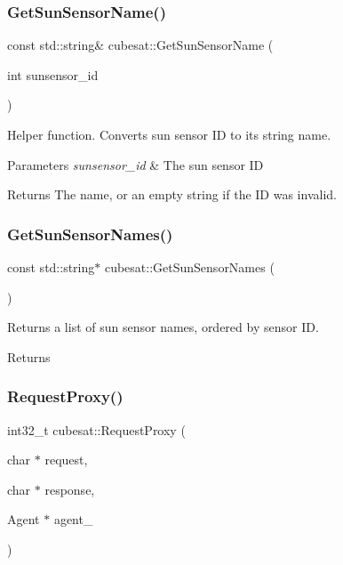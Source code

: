 \subsubsection{\texorpdfstring{Get\+Sun\+Sensor\+Name()}{GetSunSensorName()}}
{\footnotesize\ttfamily const std\+::string\& cubesat\+::\+Get\+Sun\+Sensor\+Name (\begin{DoxyParamCaption}\item[{int}]{sunsensor\+\_\+id }\end{DoxyParamCaption})\hspace{0.3cm}{\ttfamily [inline]}}



Helper function. Converts sun sensor ID to its string name. 


\begin{DoxyParams}{Parameters}
{\em sunsensor\+\_\+id} & The sun sensor ID \\
\hline
\end{DoxyParams}
\begin{DoxyReturn}{Returns}
The name, or an empty string if the ID was invalid. 
\end{DoxyReturn}
\mbox{\label{namespacecubesat_a918ca5531916495b225cc1ae5663a794}} 
\subsubsection{\texorpdfstring{Get\+Sun\+Sensor\+Names()}{GetSunSensorNames()}}
{\footnotesize\ttfamily const std\+::string$\ast$ cubesat\+::\+Get\+Sun\+Sensor\+Names (\begin{DoxyParamCaption}{ }\end{DoxyParamCaption})\hspace{0.3cm}{\ttfamily [inline]}}



Returns a list of sun sensor names, ordered by sensor ID. 

\begin{DoxyReturn}{Returns}

\end{DoxyReturn}
\mbox{\label{namespacecubesat_a9779717726c4d78b76d7a3a10556cf7a}} 
\subsubsection{\texorpdfstring{Request\+Proxy()}{RequestProxy()}}
{\footnotesize\ttfamily int32\+\_\+t cubesat\+::\+Request\+Proxy (\begin{DoxyParamCaption}\item[{char $\ast$}]{request,  }\item[{char $\ast$}]{response,  }\item[{Agent $\ast$}]{agent\+\_\+ }\end{DoxyParamCaption})}



